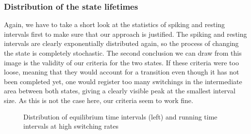 \documentclass[12pt,a4paper]{article}
\begin{document}
\subsubsection{Distribution of the state lifetimes}
Again, we have to take a short look at the statistics of spiking and resting intervals first to make sure that our approach is justified. The spiking and resting intervals are clearly exponentially distributed again, so the process of changing the state is completely stochastic. The second conclusion we can draw from this image is the validity of our criteria for the two states. If these criteria were too loose, meaning that they would account for a transition even though it has not been completed yet, one would register too many switchings in the intermediate area between both states, giving a clearly visible peak at the smallest interval size. As this is not the case here, our criteria seem to work fine.
\begin{figure}[H]
	\hspace*{-0.5cm}
	\caption{Distribution of equilibrium time intervals (left) and running time intervals at high switching rates}
	\label{intdistanhopf}
\end{figure}
\end{document}
